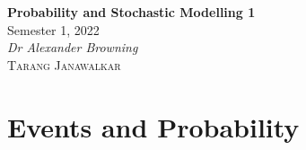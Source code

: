 \documentclass{article}
\date{}
\newcommand{\unitName}{Probability and Stochastic Modelling 1}
\newcommand{\unitTime}{Semester 1, 2022}
\newcommand{\unitCoordinator}{Dr Alexander Browning}
\newcommand{\documentAuthors}{\textsc{Tarang Janawalkar}}
\begin{document}
%
\begin{titlepage}
    \vspace*{\fill}
    \begin{center}
        \LARGE{\textbf{\unitName}} \\[0.1in]
        \normalsize{\unitTime} \\[0.2in]
        \normalsize\textit{\unitCoordinator} \\[0.2in]
        \documentAuthors
    \end{center}
    \vspace*{\fill}
    \doclicenseThis
    \thispagestyle{empty}
\end{titlepage}
\newpage
%
\tableofcontents
\newpage
%
\section{Events and Probability}
\end{document}
